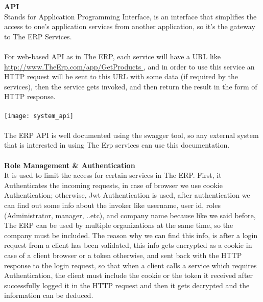 \begin{adjustwidth}{2cm}{}

    \textbf{API}\\
        Stands for Application Programming Interface, is an interface that simplifies the access to
one’s application services from another application, so it’s the gateway to The ERP
Services.\\\\
For web-based API as in The ERP, each service will have a URL like \url{http://www.TheErp.com/app/GetProducts }, and in order to use this service an HTTP request will
be sent to this URL with some data (if required by the services), then the service gets invoked,
and then return the result in the form of HTTP response.\\\\
\texttt{[image: system\_api]}\\\\
The ERP API is well documented using the swagger tool, so any external system that is
interested in using The Erp services can use this documentation.\\\\
    \textbf{Role Management \& Authentication}\\
        It is used to limit the access for certain services in The ERP.
        First, it Authenticates the incoming requests, in case of browser we use cookie
        Authentication; otherwise, Jwt Authentication is used, after authentication we can find out
        some info about the invoker like username, user id, roles (Administrator, manager, ..etc), and
        company name because like we said before, The ERP can be used by multiple organizations
        at the same time, so the company must be included. The reason why we can find this info, is
        after a login request from a client has been validated, this info gets encrypted as a cookie in
        case of a client browser or a token otherwise, and sent back with the HTTP response to the
        login request, so that when a client calls a service which requires Authentication, the client
        must include the cookie or the token it received after successfully logged it in the HTTP
        request and then it gets decrypted and the information can be deduced.\\\\

\end{adjustwidth}
